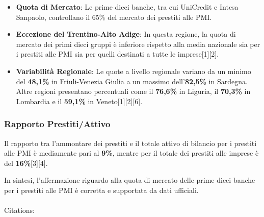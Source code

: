 \documentclass[
  letterpaper,
  DIV=11,
  numbers=noendperiod]{scrartcl}
\makeatletter
\let\oldparagraph\paragraph
\renewcommand{\paragraph}{
    \@ifstar
      \xxxParagraphStar
      \xxxParagraphNoStar
  }
\newcommand{\xxxParagraphStar}[1]{\oldparagraph*{#1}\mbox{}}
\newcommand{\xxxParagraphNoStar}[1]{\oldparagraph{#1}\mbox{}}
\providecommand{\tightlist}{%
  \setlength{\itemsep}{0pt}\setlength{\parskip}{0pt}}\usepackage{longtable,booktabs,array}
\makeatother
\begin{document}
\begin{itemize}
\tightlist
\item
  \textbf{Quota di Mercato}: Le prime dieci banche, tra cui UniCredit e
  Intesa Sanpaolo, controllano il 65\% del mercato dei prestiti alle
  PMI.
\item
  \textbf{Eccezione del Trentino-Alto Adige}: In questa regione, la
  quota di mercato dei primi dieci gruppi è inferiore rispetto alla
  media nazionale sia per i prestiti alle PMI sia per quelli destinati a
  tutte le imprese{[}1{]}{[}2{]}.
\item
  \textbf{Variabilità Regionale}: Le quote a livello regionale variano
  da un minimo del \textbf{48,1\%} in Friuli-Venezia Giulia a un massimo
  dell'\textbf{82,5\%} in Sardegna. Altre regioni presentano percentuali
  come il \textbf{76,6\%} in Liguria, il \textbf{70,3\%} in Lombardia e
  il \textbf{59,1\%} in Veneto{[}1{]}{[}2{]}{[}6{]}.
\end{itemize}

\subsubsection{Rapporto Prestiti/Attivo}\label{rapporto-prestitiattivo}

Il rapporto tra l'ammontare dei prestiti e il totale attivo di bilancio
per i prestiti alle PMI è mediamente pari al \textbf{9\%}, mentre per il
totale dei prestiti alle imprese è del \textbf{16\%}{[}3{]}{[}4{]}.

\begin{tcolorbox}[enhanced jigsaw, bottomrule=.15mm, opacityback=0, leftrule=.75mm, breakable, titlerule=0mm, left=2mm, title=\textcolor{quarto-callout-warning-color}{\faExclamationTriangle}\hspace{0.5em}{Conclusione}, colframe=quarto-callout-warning-color-frame, coltitle=black, colback=white, toprule=.15mm, colbacktitle=quarto-callout-warning-color!10!white, bottomtitle=1mm, toptitle=1mm, arc=.35mm, rightrule=.15mm, opacitybacktitle=0.6]

In sintesi, l'affermazione riguardo alla quota di mercato delle prime
dieci banche per i prestiti alle PMI è corretta e supportata da dati
ufficiali.

\end{tcolorbox}

\paragraph{Citations:}\label{citations}
\end{document}
